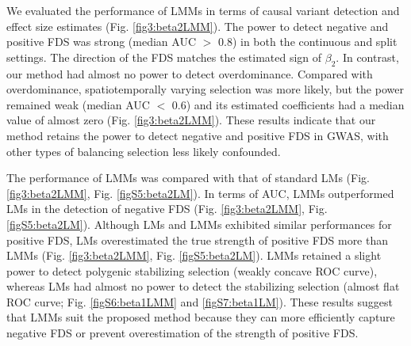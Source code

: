 \documentclass[12pt,]{article}
\begin{document}
We evaluated the performance of LMMs in terms of causal variant detection and effect size estimates (Fig. \ref{fig3:beta2LMM}). The power to detect negative and positive FDS was strong (median AUC $>$ 0.8) in both the continuous and split settings. The direction of the FDS matches the estimated sign of $\beta_2$. In contrast, our method had almost no power to detect overdominance. Compared with overdominance, spatiotemporally varying selection was more likely, but the power remained weak (median AUC $<$ 0.6) and its estimated coefficients had a median value of almost zero (Fig. \ref{fig3:beta2LMM}). These results indicate that our method retains the power to detect negative and positive FDS in GWAS, with other types of balancing selection less likely confounded. 

The performance of LMMs was compared with that of standard LMs (Fig. \ref{fig3:beta2LMM}, Fig. \ref{figS5:beta2LM}). In terms of AUC, LMMs outperformed LMs in the detection of negative FDS (Fig. \ref{fig3:beta2LMM}, Fig. \ref{figS5:beta2LM}). Although LMs and LMMs exhibited similar performances for positive FDS, LMs overestimated the true strength of positive FDS more than LMMs (Fig. \ref{fig3:beta2LMM}, Fig. \ref{figS5:beta2LM}). LMMs retained a slight power to detect polygenic stabilizing selection (weakly concave ROC curve), whereas LMs had almost no power to detect the stabilizing selection (almost flat ROC curve; Fig. \ref{figS6:beta1LMM} and \ref{figS7:beta1LM}). These results suggest that LMMs suit the proposed method because they can more efficiently capture negative FDS or prevent overestimation of the strength of positive FDS.
\end{document}
